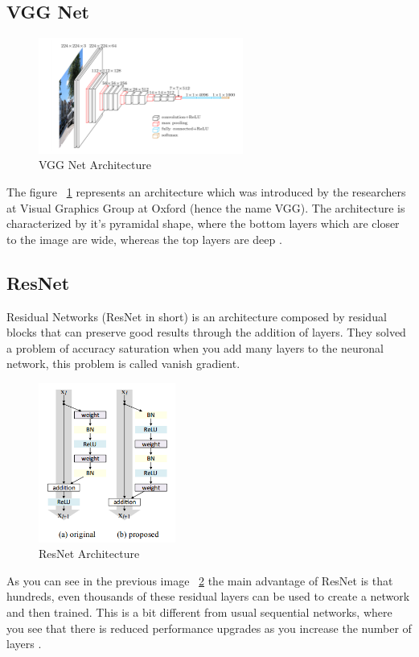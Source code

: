 \subsection[VGG Net]{VGG Net}

\begin{figure}[H]
\centering
\includegraphics[width=0.6\textwidth]{./figures/VGGNet}
\caption{VGG Net Architecture \cite{advances-architectures}}
\label{fig:vgg}
\end{figure}
The figure ~\ref{fig:vgg} represents an architecture which was introduced by the researchers at Visual Graphics Group at Oxford (hence the name VGG).
The architecture is characterized by it's pyramidal shape, where the bottom layers which are closer to the image are wide, whereas the top layers are deep \cite{advances-architectures}.


\subsection[ResNet]{ResNet}

Residual Networks (ResNet in short) is an architecture composed by residual blocks that can preserve good results through the addition of layers. They solved a problem of accuracy saturation when you add many layers to the neuronal network, this problem is called vanish gradient.

\begin{figure}[H]
\centering
\includegraphics[width=0.4\textwidth]{./figures/ResNet}
\caption{ResNet Architecture \cite{advances-architectures}}
\label{fig:resnet}
\end{figure}

As you can see in the previous image ~\ref{fig:resnet} the main advantage of ResNet is that hundreds, even thousands of these residual layers can be used to create a network and then trained. This is a bit different from usual sequential networks, where you see that there is reduced performance upgrades as you increase the number of layers \cite{advances-architectures}.


